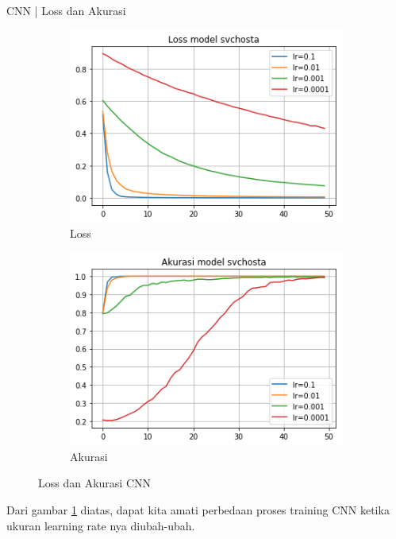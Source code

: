\documentclass[t]{beamer}
\begin{document}
\begin{frame}{CNN | Loss dan Akurasi}
    \begin{figure}[H]
    \begin{subfigure}[b]{.45\linewidth}
        \includegraphics[width=\textwidth]{public/assets/img/cnn_svchosta_loss.png}
        \caption{Loss}
    \end{subfigure}
    \begin{subfigure}[b]{.45\linewidth}
        \includegraphics[width=\textwidth]{public/assets/img/cnn_svchosta_acc.png}
        \caption{Akurasi}
    \end{subfigure}
    \caption{Loss dan Akurasi CNN}
    \label{fig:cnn_svchosta}
    \end{figure}
    \par Dari gambar \ref{fig:cnn_svchosta} diatas, dapat kita amati perbedaan proses training CNN ketika ukuran learning rate nya diubah-ubah.
\end{frame}
\end{document}
